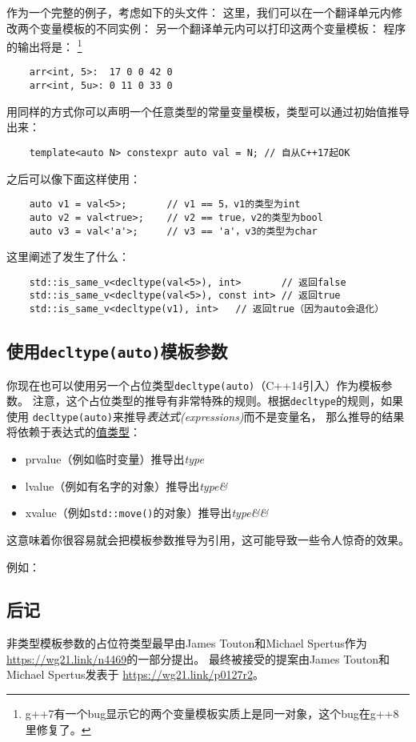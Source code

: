作为一个完整的例子，考虑如下的头文件：
这里，我们可以在一个翻译单元内修改两个变量模板的不同实例：
另一个翻译单元内可以打印这两个变量模板：
程序的输出将是：
\footnote{g++7有一个bug显示它的两个变量模板实质上是同一对象，这个bug在g++8里修复了。}
\begin{lstlisting}
    arr<int, 5>:  17 0 0 42 0
    arr<int, 5u>: 0 11 0 33 0
\end{lstlisting}
用同样的方式你可以声明一个任意类型的常量变量模板，类型可以通过初始值推导出来：
\begin{lstlisting}
    template<auto N> constexpr auto val = N; // 自从C++17起OK
\end{lstlisting}
之后可以像下面这样使用：
\begin{lstlisting}
    auto v1 = val<5>;       // v1 == 5，v1的类型为int
    auto v2 = val<true>;    // v2 == true，v2的类型为bool
    auto v3 = val<'a'>;     // v3 == 'a'，v3的类型为char
\end{lstlisting}
这里阐述了发生了什么：
\begin{lstlisting}
    std::is_same_v<decltype(val<5>), int>       // 返回false
    std::is_same_v<decltype(val<5>), const int> // 返回true
    std::is_same_v<decltype(v1), int>   // 返回true（因为auto会退化）
\end{lstlisting}

\subsection{使用\texttt{decltype(auto)}模板参数}
你现在也可以使用另一个占位类型\texttt{decltype(auto)}（C++14引入）作为模板参数。
注意，这个占位类型的推导有非常特殊的规则。根据\texttt{decltype}的规则，如果使用
\texttt{decltype(auto)}来推导\emph{表达式(expressions)}而不是变量名，
那么推导的结果将依赖于表达式的\hyperref[ch5.3.1]{值类型}：
\begin{itemize}[leftmargin=*]
    \item prvalue（例如临时变量）推导出\emph{type}
    \item lvalue（例如有名字的对象）推导出\emph{type\&}
    \item xvalue（例如\texttt{std::move()}的对象）推导出\emph{type\&\&}
\end{itemize}
这意味着你很容易就会把模板参数推导为引用，这可能导致一些令人惊奇的效果。

例如：

\subsection{后记}
非类型模板参数的占位符类型最早由James Touton和Michael Spertus作为
\url{https://wg21.link/n4469}的一部分提出。
最终被接受的提案由James Touton和Michael Spertus发表于
\url{https://wg21.link/p0127r2}。
